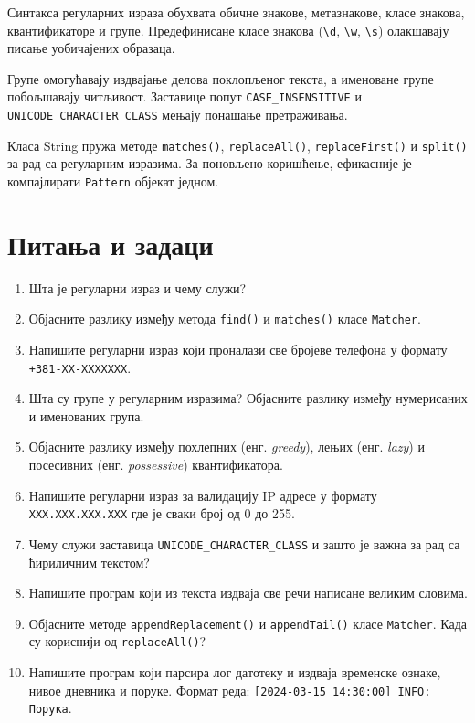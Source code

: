 Синтакса регуларних израза обухвата обичне знакове, метазнакове, класе знакова, квантификаторе и групе. Предефинисане класе знакова (\texttt{\textbackslash{}d}, \texttt{\textbackslash{}w}, \texttt{\textbackslash{}s}) олакшавају писање уобичајених образаца.

Групе омогућавају издвајање делова поклопљеног текста, а именоване групе побољшавају читљивост. Заставице попут \texttt{CASE\_INSENSITIVE} и \texttt{UNICODE\_CHARACTER\_CLASS} мењају понашање претраживања.

Класа String пружа методе \texttt{matches()}, \texttt{replaceAll()}, \texttt{replaceFirst()} и \texttt{split()} за рад са регуларним изразима. За поновљено коришћење, ефикасније је компајлирати \texttt{Pattern} објекат једном.


\section{Питања и задаци}

\begin{enumerate}
\item Шта је регуларни израз и чему служи?
\item Објасните разлику између метода \texttt{find()} и \texttt{matches()} класе \texttt{Matcher}.
\item Напишите регуларни израз који проналази све бројеве телефона у формату \texttt{+381-XX-XXXXXXX}.
\item Шта су групе у регуларним изразима? Објасните разлику између нумерисаних и именованих група.
\item Објасните разлику између похлепних (енг. \textit{greedy}), лењих (енг. \textit{lazy}) и посесивних (енг. \textit{possessive}) квантификатора.
\item Напишите регуларни израз за валидацију IP адресе у формату \texttt{XXX.XXX.XXX.XXX} где је сваки број од 0 до 255.
\item Чему служи заставица \texttt{UNICODE\_CHARACTER\_CLASS} и зашто је важна за рад са ћириличним текстом?
\item Напишите програм који из текста издваја све речи написане великим словима.
\item Објасните методе \texttt{appendReplacement()} и \texttt{appendTail()} класе \texttt{Matcher}. Када су кориснији од \texttt{replaceAll()}?
\item Напишите програм који парсира лог датотеку и издваја временске ознаке, нивое дневника и поруке. Формат реда: \texttt{[2024-03-15 14:30:00] INFO: Порука}.
\end{enumerate}
\setlength{\parindent}{15pt}
\setlength{\parskip}{0pt}
